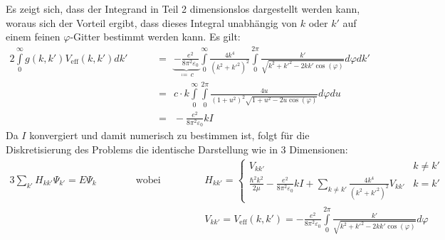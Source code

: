 Es zeigt sich, dass der Integrand in Teil 2 dimensionslos dargestellt werden kann, woraus sich der Vorteil ergibt, dass dieses Integral unabhängig von $k$ oder $k'$ auf einem feinen $\varphi$-Gitter bestimmt werden kann. Es gilt: 
\begin{alignat*}{2}
\int\limits_{0}^{\infty}g(k,k')V_\text{eff}(k,k')dk' 
		&& \ \ &= \ \ \underbrace{-\frac{e^2}{8\pi^2\varepsilon_0}}_{\coloneqq \,c} 
		\int\limits_{0}^{\infty}\frac{4k^4}{(k^2+k '^2)^2}\int\limits_{0}^{2\pi}  \frac{k'}{\sqrt{k^2+k'^2-2kk'\cos(\varphi)}} d\varphi dk' \\
		&&\ \ &= \ \ c\cdot k \int\limits_{0}^{\infty}\int\limits_{0}^{2\pi} \frac{4u}{(1+u^2)^2\sqrt{1+u^2-2u\cos(\varphi)}} d\varphi du\\ 
		&&\ \ &= \ \ -\frac{e^2}{8\pi^2\varepsilon_0} k I
\end{alignat*}
Da $I$ konvergiert und damit numerisch zu bestimmen ist, folgt für die Diskretisierung des Problems die identische Darstellung wie in 3 Dimensionen:
\begin{alignat*}{3}
\sum\limits_{k'}H_{kk'}\Psi_{k'} = E \Psi_k && \qquad \text{  wobei}\qquad && &H_{kk'}= 
	 \begin{cases}
     V_{kk'}  &k \neq k' \\
     \frac{\hbar ^2 k^2}{2\mu} -\frac{e^2}{8\pi^2\varepsilon_0} k I +\sum\limits_{k\neq k'}\frac{4k^4}{(k^2+k '^2)^2}V_{kk'} &k=k'
   \end{cases}\\
  &&  && &V_{kk'} = V_\text{eff}(k,k')=-\frac{e^2}{8\pi^2\varepsilon_0}\int\limits_{0}^{2\pi}  \frac{k'}{\sqrt{k^2+k'^2-2kk'\cos(\varphi)}} d\varphi
\end{alignat*}
